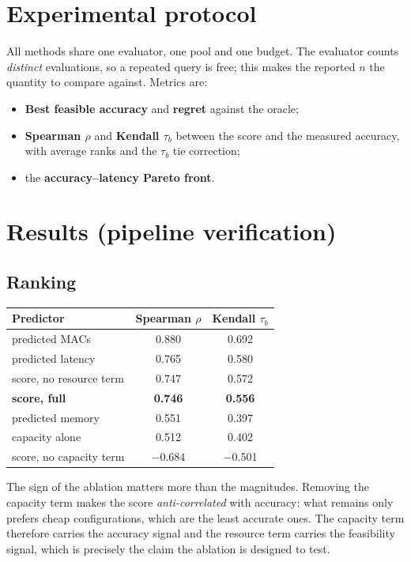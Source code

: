 \documentclass[11pt,a4paper]{article}
\begin{document}
\section{Experimental protocol}

All methods share one evaluator, one pool and one budget. The evaluator counts
\emph{distinct} evaluations, so a repeated query is free; this makes the reported
$n$ the quantity to compare against. Metrics are:

\begin{itemize}
  \item \textbf{Best feasible accuracy} and \textbf{regret} against the oracle;
  \item \textbf{Spearman $\rho$} and \textbf{Kendall $\tau_b$} between the score
        and the measured accuracy, with average ranks and the $\tau_b$ tie
        correction;
  \item the \textbf{accuracy--latency Pareto front}.
\end{itemize}

\section{Results (pipeline verification)}

\subsection{Ranking}

\begin{center}
\begin{tabular}{@{}lcc@{}}
\toprule
Predictor & Spearman $\rho$ & Kendall $\tau_b$ \\
\midrule
predicted MACs          & 0.880 & 0.692 \\
predicted latency       & 0.765 & 0.580 \\
score, no resource term & 0.747 & 0.572 \\
\textbf{score, full}    & \textbf{0.746} & \textbf{0.556} \\
predicted memory        & 0.551 & 0.397 \\
capacity alone          & 0.512 & 0.402 \\
score, no capacity term & $-$0.684 & $-$0.501 \\
\bottomrule
\end{tabular}
\end{center}

The sign of the ablation matters more than the magnitudes. Removing the capacity
term makes the score \emph{anti-correlated} with accuracy: what remains only
prefers cheap configurations, which are the least accurate ones. The capacity
term therefore carries the accuracy signal and the resource term carries the
feasibility signal, which is precisely the claim the ablation is designed to
test.
\end{document}
